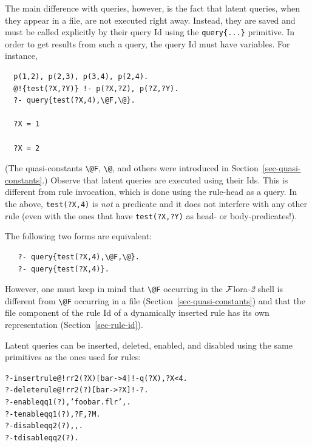 \documentclass[11pt]{article}
\newcommand{\FLORA}{{\mbox{\sc ${\cal F}${lora}\rm\emph{-2}}}\xspace}
\newcommand{\FLSYSTEM}{\FLORA}
\newcommand{\flrext}{flr\xspace}
\newcommand{\bs}{\textbackslash}
\begin{document}
The main difference with queries, however, is the fact that latent queries,
when they appear in a file,
are not executed right away. Instead, they are saved and must be called
explicitly by their query Id using the \texttt{query\{...\}} primitive. In
order to get results from such a query,
the query Id must have variables. For instance,
\begin{verbatim}
  p(1,2), p(2,3), p(3,4), p(2,4).
  @!{test(?X,?Y)} !- p(?X,?Z), p(?Z,?Y).
  ?- query{test(?X,4),\@F,\@}.

  ?X = 1

  ?X = 2
\end{verbatim}
(The quasi-constants \texttt{\bs{}@F}, \texttt{\bs{}@}, and others
were introduced in Section~\ref{sec-quasi-constants}.)
Observe that latent queries are executed using their Ids. This is different
from rule invocation, which is done using the rule-head as a query. In the
above, \texttt{test(?X,4)} is \emph{not} a predicate and it does not
interfere with any other rule (even with the ones that have \texttt{test(?X,?Y)}
as head- or body-predicates!).

The following two forms are equivalent:
\begin{verbatim}
   ?- query{test(?X,4),\@F,\@}.
   ?- query{test(?X,4)}.
\end{verbatim}
However, one must keep in mind that \texttt{\bs{}@F} occurring 
in the \FLSYSTEM shell is
different from \texttt{\bs{}@F} occurring in a file
(Section~\ref{sec-quasi-constants}) and that the file component of the rule
Id of a dynamically inserted rule has its own representation
(Section~\ref{sec-rule-id}).

Latent queries can be inserted, deleted, enabled, and disabled using the
same primitives as the ones used for rules:
\begin{alltt}
 ?- insertrule{@!{rr2(?X)[bar->4]} !- q(?X), ?X<4}.
 ?- deleterule{@!{rr2(?)[bar->?X]} !- ?}.
 ?- enable{qq1(?),'foobar.\flrext',\@}.
 ?- tenable{qq1(?),?F,?M}.
 ?- disable{qq2(?),\@F,\@}.
 ?- tdisable{qq2(?)}.
\end{alltt}
\end{document}
